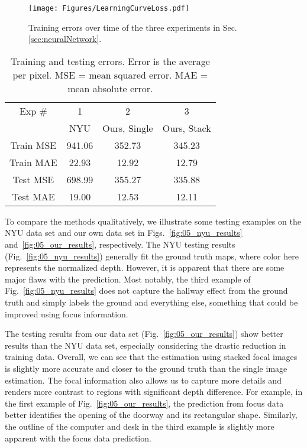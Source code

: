 \documentclass[letterpaper, 10 pt, conference]{ieeeconf}  %
\begin{document}
\begin{figure}[h]
\centering
        \texttt{[image: Figures/LearningCurveLoss.pdf]}
        \caption{Training errors over time of the three experiments in Sec. \ref{sec:neuralNetwork}.}
\label{fig:LearningCurveLoss}
\end{figure}\begin{table}
\label{tab:trainTestError}
\begin{center}
\begin{tabular}{|c|c|c|c|}
\hline 
Exp \#  &  1   &  2  & 3\\ 
  &  NYU   &  Ours, Single  & Ours, Stack\\ 
\hline
Train MSE &  941.06  &  352.73  & 345.23   \\
\hline
Train MAE &  22.93  &  12.92  & 12.79   \\
\hline
Test MSE &  698.99  &  355.27  & 335.88   \\
\hline
Test MAE &  19.00  &  12.53  & 12.11   \\
\hline
\end{tabular}
\end{center}
\caption{Training and testing errors. Error is the average per pixel. MSE = mean squared error. MAE = mean absolute error.}
\end{table}

To compare the methods qualitatively, we illustrate some testing examples on the NYU data set and our own data set in Figs.~\ref{fig:05_nyu_results} and~\ref{fig:05_our_results}, respectively. The NYU testing results (Fig.~\ref{fig:05_nyu_results}) generally fit the ground truth maps, where color here represents the normalized depth. However, it is apparent that there are some major flaws with the prediction. Most notably, the third example of Fig.~\ref{fig:05_nyu_results} does not capture the hallway effect from the ground truth and simply labels the ground and everything else, something that could be improved using focus information. 

The testing results from our data set (Fig.~\ref{fig:05_our_results}) show better results than the NYU data set, especially considering the drastic reduction in training data. Overall, we can see that the estimation using stacked focal images is slightly more accurate and closer to the ground truth than the single image estimation. The focal information also allows us to capture more details and renders more contrast to regions with significant depth difference. For example, in the first example of Fig.~\ref{fig:05_our_results}, the prediction from focus data better identifies the opening of the doorway and its rectangular shape. Similarly, the outline of the computer and desk in the third example is slightly more apparent with the focus data prediction. 
\end{document}
